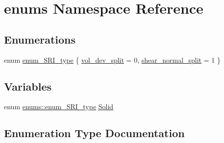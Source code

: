 \hypertarget{namespaceenums}{}\section{enums Namespace Reference}
\label{namespaceenums}
\subsection*{Enumerations}
\begin{DoxyCompactItemize}
\item 
enum \hyperlink{namespaceenums_ad159a7d6539f111883db3b07c09601a8}{enum\+\_\+\+S\+R\+I\+\_\+type} \{ \hyperlink{namespaceenums_ad159a7d6539f111883db3b07c09601a8ad2c871b65148302b24a39fac6cedfd40}{vol\+\_\+dev\+\_\+split} = 0, 
\hyperlink{namespaceenums_ad159a7d6539f111883db3b07c09601a8a2754f7ec0e001029442600188c83d582}{shear\+\_\+normal\+\_\+split} = 1
 \}
\end{DoxyCompactItemize}
\subsection*{Variables}
\begin{DoxyCompactItemize}
\item 
enum \hyperlink{namespaceenums_ad159a7d6539f111883db3b07c09601a8}{enums\+::enum\+\_\+\+S\+R\+I\+\_\+type} \hyperlink{namespaceenums_aea86a2beeb3b43f96447126c7f5dd2f3}{Solid}
\end{DoxyCompactItemize}


\subsection{Enumeration Type Documentation}
